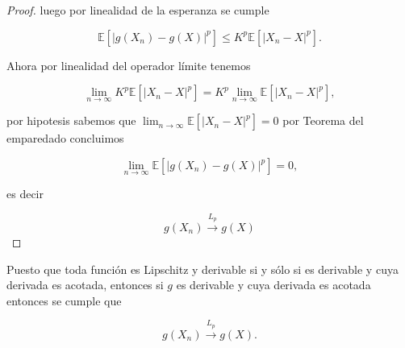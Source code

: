 \documentclass[letterpaper]{article}
\theoremstyle{definition}
\theoremstyle{lemathm}
\theoremstyle{lemademthm}
\newcommand{\limninf}{\lim_{n\to\infty}}
\newcommand{\bracs}[1]{\left[ #1 \right] }
\newcommand{\1}{\mathbbm{1}}
\begin{document}
\begin{enumerate}
\begin{itemize}
\begin{proof}
				luego por linealidad de la esperanza se cumple

				\[\mathbb{E}\bracs{|g(X_n)-g(X)|^p} \leq K^p\mathbb{E}\bracs{|X_n-X|^p}.\]

				Ahora por linealidad del operador límite tenemos

				\[\limninf K^p\mathbb{E}\bracs{|X_n-X|^p} = K^p \limninf \mathbb{E}\bracs{|X_n-X|^p},\]

				por hipotesis sabemos que $\limninf \mathbb{E}\bracs{|X_n-X|^p} = 0$ por Teorema del emparedado concluimos

				\[\limninf \mathbb{E}\bracs{|g(X_n)-g(X)|^p} = 0,\]

				es decir

				\[g(X_n) \xrightarrow{L_p} g(X)\]

			\end{proof}

			Puesto que toda función es Lipschitz y derivable si y sólo si es derivable y cuya derivada es acotada, entonces si $g$ es derivable y cuya derivada es acotada entonces se cumple que

			\[g(X_n) \xrightarrow{L_p} g(X).\]


			













\end{itemize}
\end{enumerate}
\end{document}

